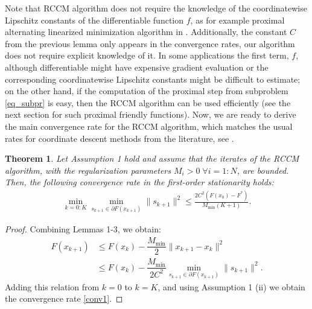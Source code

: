 \documentclass[lettersize,journal]{IEEEtran}
\newtheorem{thm}{Theorem}
\begin{document}
\noindent Note that  RCCM algorithm  does not require the knowledge of  the coordinatewise Lipschitz constants of the differentiable function  $f$, as for example proximal alternating linearized minimization algorithm in  \cite{Teb:14}. Additionally, the constant $C$ from the previous lemma  only appears in the convergence rates, our algorithm does not require explicit knowledge of it. In some applications  the first term, $f$, although differentiable might have expensive  gradient evaluation or  the corresponding  coordinatewise Lipschitz constants  might be difficult to estimate; on the other hand,  if the computation of the proximal step  from subproblem \eqref{eq_subpr} is easy, then  the RCCM algorithm  can be used efficiently (see the next section for such proximal friendly functions). Now, we are ready to derive the main convergence rate for the RCCM algorithm, which matches the usual rates for coordinate descent methods from the literature, see   \cite{NecCho:24, Teb:14}.

\begin{thm}
Let Assumption 1 hold and assume that the iterates of the RCCM algorithm, with  the regularization parameters $M_i> 0 \;  \forall i=1:N$,  are bounded. Then, the following convergence rate in the first-order stationarity  holds:  
\begin{align}
\label{conv1}
\min_{k=0: K}  \min_{s_{k+1} \in \partial F(x_{k+1})} \|s_{k+1}\|^2 \leq \frac{2 C^2 \left( F(x_0) - F^* \right) }{M_{\min} (K+1)}.     
\end{align}
\end{thm}

\begin{proof}
Combining Lemmas 1-3, we obtain:
\begin{align}
\label{eq:cr}
  F(x_{k+1}) & \leq F(x_{k}) - \dfrac{M_{\min}}{2} \|x_{k+1} - x_{k}\|^2 \nonumber \\
&  \leq F(x_{k}) - \dfrac{M_{\min}}{2 C^2}  \min_{s_{k+1} \in \partial F(x_{k+1})} \|s_{k+1}\|^2.
\end{align}
Adding this relation from $k=0$ to $k=K$, and using Assumption 1 (ii) we obtain the convergence rate \eqref{conv1}. 
\end{proof}
\end{document}
